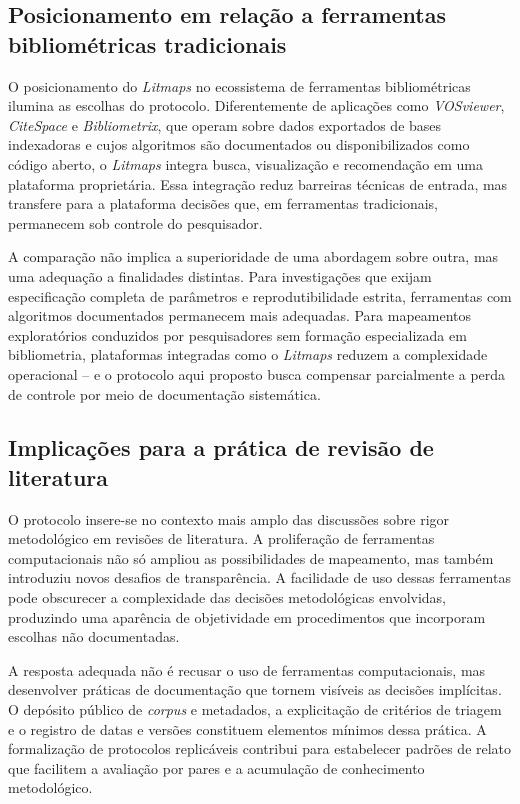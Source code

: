 \documentclass[portuguese]{textolivre}
\begin{document}
\subsection{Posicionamento em relação a ferramentas bibliométricas tradicionais}\label{sec-quotesandfootnotes}
O posicionamento do \textit{Litmaps} no ecossistema de ferramentas bibliométricas ilumina as escolhas do protocolo. Diferentemente de aplicações como \textit{VOSviewer}, \textit{CiteSpace} e \textit{Bibliometrix}, que operam sobre dados exportados de bases indexadoras e cujos algoritmos são documentados ou disponibilizados como código aberto, o \textit{Litmaps} integra busca, visualização e recomendação em uma plataforma proprietária. Essa integração reduz barreiras técnicas de entrada, mas transfere para a plataforma decisões que, em ferramentas tradicionais, permanecem sob controle do pesquisador.

	A comparação não implica a superioridade de uma abordagem sobre outra, mas uma adequação a finalidades distintas. Para investigações que exijam especificação completa de parâmetros e reprodutibilidade estrita, ferramentas com algoritmos documentados permanecem mais adequadas. Para mapeamentos exploratórios conduzidos por pesquisadores sem formação especializada em bibliometria, plataformas integradas como o \textit{Litmaps} reduzem a complexidade operacional – e o protocolo aqui proposto busca compensar parcialmente a perda de controle por meio de documentação sistemática.



\subsection{Implicações para a prática de revisão de literatura}\label{sec-equacao}
	O protocolo insere-se no contexto mais amplo das discussões sobre rigor metodológico em revisões de literatura. A proliferação de ferramentas computacionais não só ampliou as possibilidades de mapeamento, mas também introduziu novos desafios de transparência. A facilidade de uso dessas ferramentas pode obscurecer a complexidade das decisões metodológicas envolvidas, produzindo uma aparência de objetividade em procedimentos que incorporam escolhas não documentadas.
    
	A resposta adequada não é recusar o uso de ferramentas computacionais, mas desenvolver práticas de documentação que tornem visíveis as decisões implícitas. O depósito público de \textit{corpus} e metadados, a explicitação de critérios de triagem e o registro de datas e versões constituem elementos mínimos dessa prática. A formalização de protocolos replicáveis contribui para estabelecer padrões de relato que facilitem a avaliação por pares e a acumulação de conhecimento metodológico.
    
\end{document}
